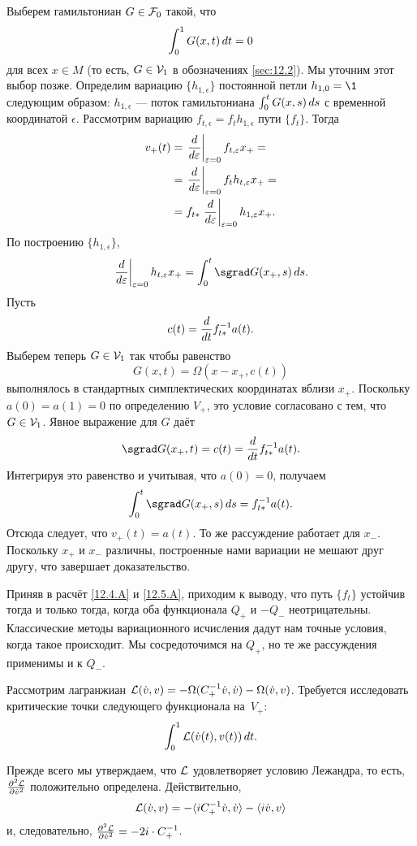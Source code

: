 Выберем гамильтониан $G\in\mathcal{F}_0$ такой, что
\[\int_0^1G(x, t)\,d t = 0\]
для всех $x\in M$ (то есть, $G\in\mathcal{V}_1$ в обозначениях \ref{sec:12.2}).
Мы уточним этот выбор позже.
Определим вариацию $\{h_{1,\epsilon}\}$ постоянной петли $h_{1,0} =
\1$ следующим образом: $h_{1,\epsilon}$ — поток гамильтониана
$\int_0^tG(x,s)\,d s$ с временной координатой $\epsilon$. 
Рассмотрим вариацию $f_{t,\epsilon} = f_th_{1,\epsilon}$ пути $\{f_t\}$.
Тогда
\begin{align*}
v_+(t) &= \left.\frac{d}{d \varepsilon}\right|_{\varepsilon=0} f_{t,\varepsilon} x_+ =
\\
&=\left.\frac{d}{d \varepsilon}\right|_{\varepsilon=0}f_th_{t,\varepsilon} x_+=
\\
&=
f_{t*} \left.\frac{d}{d \varepsilon}\right|_{\varepsilon=0} h_{1,\varepsilon} x_+.
\end{align*}
По построению $\{h_{1,\epsilon}\}$,
\[\left.\frac{\d}{\d \epsilon}\right|_{\epsilon=0}h_{t,\epsilon}x_+
=
\int_0^t\sgrad G(x_+,s)\,\d s.\]
Пусть 
\[c(t) = \frac{d}{d t}f^{-1}_{t*} a(t).\]
Выберем теперь $G \in \mathcal{V}_1$ так чтобы равенство
\[G(x, t) = \Omega(x - x_+, c(t))\]
выполнялось в стандартных симплектических координатах вблизи $x_+$.
Поскольку $a(0) = a(1) = 0$ по определению $V_+$, это условие
согласовано с тем, что $G\in\mathcal{V}_1$. 
Явное выражение для $G$ даёт 
\[\sgrad G(x_+, t) = c(t) = \frac{\d}{\d t}f^{-1}_{t*} a(t).\]
Интегрируя это равенство и учитывая, что $a(0) = 0$, получаем
\[\int_0^t\sgrad G(x_+, s)\,\d s = f_{t*}^{-1}a(t).\]
Отсюда следует, что $v_+(t) = a(t)$.
То же рассуждение работает для $x_-$.
Поскольку $x_+$ и $x_-$ различны, построенные нами вариации не мешают
друг другу, 
что завершает доказательство.
\qeds

Приняв в расчёт \ref{12.4.A} и \ref{12.5.A}, приходим к выводу, что
путь $\{f_t\}$ устойчив тогда и только тогда, когда оба
функционала $Q_+$ и $-Q_-$ неотрицательны. 
Классические методы вариационного исчисления дадут нам точные условия,
когда такое происходит. 
Мы сосредоточимся на $Q_+$, но те же рассуждения применимы и к $Q_-$.

Рассмотрим лагранжиан $\mathcal{L}(\dot v, v) = -\Omega(C_+^{-1}\dot v, \dot v)
- \Omega(\dot v, v)$. 
Требуется исследовать критические точки следующего функционала на~$V_+$:
\[\int_0^1 \mathcal{L}(\dot v(t), v(t))\,d t.\]

Прежде всего мы утверждаем, что $\mathcal{L}$ удовлетворяет условию Лежандра,
то есть, $\tfrac{\partial^2\mathcal{L}}{\partial\dot v^2}$ положительно
определена. 
Действительно, 
\[\mathcal{L}( \dot v, v) = -\langle iC_+^{-1} \dot v,\dot v\rangle - \langle i\dot v, v\rangle\]
и, следовательно, $\tfrac{\partial^2\mathcal{L}}{\partial\dot v^2}= - 2i\cdot C_+^{-1}$.

